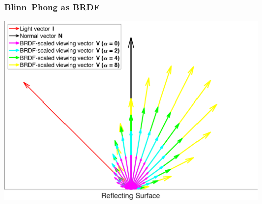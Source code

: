 \documentclass{beamer}
\begin{document}
\begin{frame}
\frametitle{Blinn--Phong as BRDF}
\centerline{\includegraphics[scale=0.4]{./figs/BRDF_Vectors.pdf}}
\end{frame}
\end{document}
